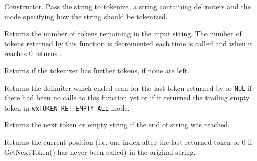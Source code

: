 
Constructor. Pass the string to tokenize, a string containing delimiters
and the mode specifying how the string should be tokenized.


\label{wxstringtokenizercounttokens}


Returns the number of tokens remaining in the input string. The number of
tokens returned by this function is decremented each time 
 is called and when it
reaches $0$  returns
\false.


\label{wxstringtokenizerhasmoretokens}


Returns \true if the tokenizer has further tokens, \false if none are left.


\label{wxstringtokenizergetlastdelimiter}


Returns the delimiter which ended scan for the last token returned by 
 or \texttt{NUL} if
there had been no calls to this function yet or if it returned the trailing
empty token in \texttt{wxTOKEN\_RET\_EMPTY\_ALL} mode.



\label{wxstringtokenizergetnexttoken}


Returns the next token or empty string if the end of string was reached.


\label{wxstringtokenizergetposition}


Returns the current position (i.e. one index after the last returned
token or 0 if GetNextToken() has never been called) in the original
string.


\label{wxstringtokenizergetstring}

